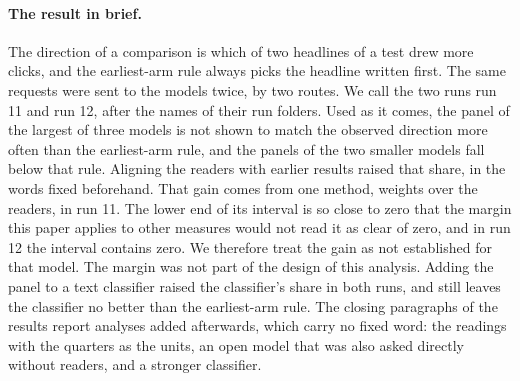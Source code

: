 \paragraph{The result in brief.} The direction of a comparison is which of two headlines of a test drew more clicks, and the earliest-arm rule always picks the headline written first. The same requests were sent to the models twice, by two routes. We call the two runs run 11 and run 12, after the names of their run folders. Used as it comes, the panel of the largest of three models is not shown to match the observed direction more often than the earliest-arm rule, and the panels of the two smaller models fall below that rule. Aligning the readers with earlier results raised that share, in the words fixed beforehand. That gain comes from one method, weights over the readers, in run 11. The lower end of its interval is so close to zero that the margin this paper applies to other measures would not read it as clear of zero, and in run 12 the interval contains zero. We therefore treat the gain as not established for that model. The margin was not part of the design of this analysis. Adding the panel to a text classifier raised the classifier's share in both runs, and still leaves the classifier no better than the earliest-arm rule. The closing paragraphs of the results report analyses added afterwards, which carry no fixed word: the readings with the quarters as the units, an open model that was also asked directly without readers, and a stronger classifier.

